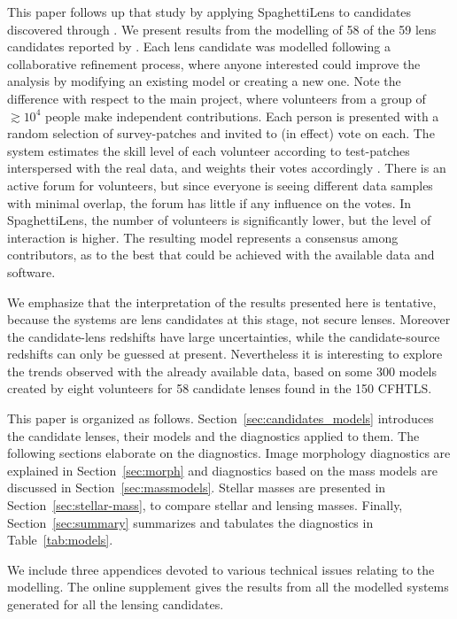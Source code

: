 This paper follows up that study by applying SpaghettiLens to
candidates discovered through \SW.  We present results from
the modelling of 58 of the 59 lens candidates reported by
\cite{2016MNRAS.455.1191M}.  Each lens candidate was modelled
following a collaborative refinement process, where anyone interested
could improve the analysis by modifying an existing model or creating
a new one. Note the difference with respect to the main \SW 
project, where volunteers from a group of $\gtrsim10^4$ people make
independent contributions.  Each person is presented with a random
selection of survey-patches and invited to (in effect) vote on each.
The system estimates the skill level of each volunteer according to
test-patches interspersed with the real data, and weights their votes
accordingly \citep{2016MNRAS.455.1171M}.  There is an active forum for
volunteers, but since everyone is seeing different data samples with
minimal overlap, the forum has little if any influence on the votes.
In SpaghettiLens, the number of volunteers is significantly lower, but
the level of interaction is higher.  The resulting model represents a
consensus among contributors, as to the best that could be achieved
with the available data and software.

We emphasize that the interpretation of the results presented here is
tentative, because the systems are lens candidates at this stage, not
secure lenses.  Moreover the candidate-lens redshifts have large
uncertainties, while the candidate-source redshifts can only be
guessed at present.  Nevertheless it is interesting to explore the
trends observed with the already available data, based on some 300 models
created by eight volunteers for 58 candidate lenses found in the 150\sqdeg
CFHTLS.

This paper is organized as follows.
Section~\ref{sec:candidates_models} introduces the candidate lenses,
their models and the diagnostics applied to them.  The following
sections elaborate on the diagnostics.  Image morphology diagnostics
are explained in Section~\ref{sec:morph} and diagnostics based on the
mass models are discussed in Section~\ref{sec:massmodels}.  Stellar masses are
presented in Section~\ref{sec:stellar-mass}, to compare stellar and
lensing masses.  Finally, Section~\ref{sec:summary}
summarizes and tabulates the diagnostics in Table~\ref{tab:models}.

We include three appendices devoted to various technical issues
relating to the modelling.  The online supplement gives the results
from all the modelled systems generated for all the lensing
candidates.


